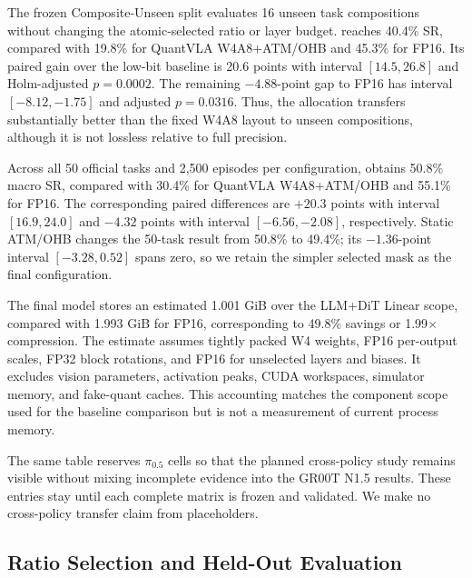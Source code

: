 The frozen Composite-Unseen split evaluates 16 unseen task compositions without changing the atomic-selected ratio or layer budget. \method reaches 40.4\% SR, compared with 19.8\% for QuantVLA W4A8+ATM/OHB and 45.3\% for FP16. Its paired gain over the low-bit baseline is 20.6 points with interval $[14.5,26.8]$ and Holm-adjusted $p=0.0002$. The remaining $-4.88$-point gap to FP16 has interval $[-8.12,-1.75]$ and adjusted $p=0.0316$. Thus, the allocation transfers substantially better than the fixed W4A8 layout to unseen compositions, although it is not lossless relative to full precision.

Across all 50 official tasks and 2,500 episodes per configuration, \method obtains 50.8\% macro SR, compared with 30.4\% for QuantVLA W4A8+ATM/OHB and 55.1\% for FP16. The corresponding paired differences are $+20.3$ points with interval $[16.9,24.0]$ and $-4.32$ points with interval $[-6.56,-2.08]$, respectively. Static ATM/OHB changes the 50-task result from 50.8\% to 49.4\%; its $-1.36$-point interval $[-3.28,0.52]$ spans zero, so we retain the simpler selected mask as the final configuration.

The final model stores an estimated 1.001 GiB over the LLM+DiT Linear scope, compared with 1.993 GiB for FP16, corresponding to 49.8\% savings or 1.99$\times$ compression. The estimate assumes tightly packed W4 weights, FP16 per-output scales, FP32 block rotations, and FP16 for unselected layers and biases. It excludes vision parameters, activation peaks, CUDA workspaces, simulator memory, and fake-quant caches. This accounting matches the component scope used for the baseline comparison but is not a measurement of current process memory.

The same table reserves $\pi_{0.5}$ cells so that the planned cross-policy study remains visible without mixing incomplete evidence into the GR00T N1.5 results. These entries stay \todoresult{} until each complete matrix is frozen and validated. We make no cross-policy transfer claim from placeholders.

\subsection{Ratio Selection and Held-Out Evaluation}
\label{sec:ratio}



